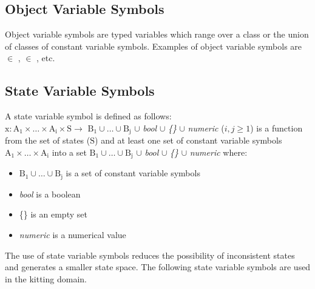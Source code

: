 \subsection{Object Variable Symbols}
Object variable symbols are typed variables which range over a class or the union of classes of constant variable symbols. Examples of object variable symbols are  $\in$ ,  $\in$ , etc.

\subsection{State Variable Symbols}
\label{subsect:State_Variable_Symbols}
A state variable symbol is defined as follows:\\
$\mathrm{x: A_1\times \dots\times A_i\times S\rightarrow}$ $\mathrm{B_1\cup\dots\cup B_j}$ $\cup$ \textit{bool} $\cup$ \textit{\{\}} $\cup$ \textit{numeric} ($i, j\geq 1$) is a function from the set of states ($\mathrm{S}$) and at least one set of constant variable symbols $\mathrm{A_1\times \dots\times A_i}$ into a set $\mathrm{B_1\cup\dots\cup B_j}$ $\cup$ \textit{bool} $\cup$ \textit{\{\}} $\cup$ \textit{numeric} where:

\begin{itemize}
\item $\mathrm{B_1\cup\dots\cup B_j}$ is a set of constant variable symbols
\item \textit{bool} is a boolean
\item \{\} is an empty set
\item \textit{numeric} is a numerical value
\end{itemize}

\noindent
The use of state variable symbols reduces the possibility of inconsistent states and generates a smaller state space. The following state variable symbols are used in the kitting domain.

